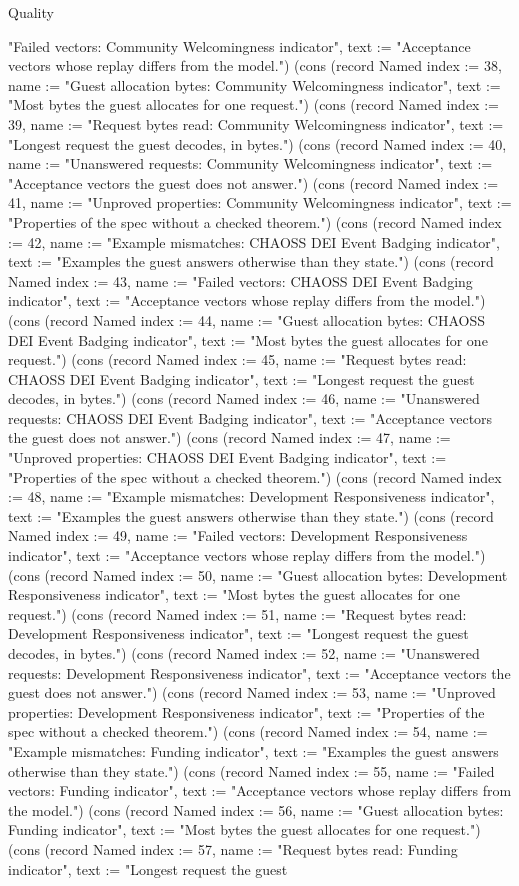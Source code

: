 \begin{lexlean}{Quality}
\begin{semanticmodule}
{"Failed vectors: Community Welcomingness indicator", text := "Acceptance vectors whose replay differs from the model."}) (cons (record Named {index := 38, name := "Guest allocation bytes: Community Welcomingness indicator", text := "Most bytes the guest allocates for one request."}) (cons (record Named {index := 39, name := "Request bytes read: Community Welcomingness indicator", text := "Longest request the guest decodes, in bytes."}) (cons (record Named {index := 40, name := "Unanswered requests: Community Welcomingness indicator", text := "Acceptance vectors the guest does not answer."}) (cons (record Named {index := 41, name := "Unproved properties: Community Welcomingness indicator", text := "Properties of the spec without a checked theorem."}) (cons (record Named {index := 42, name := "Example mismatches: CHAOSS DEI Event Badging indicator", text := "Examples the guest answers otherwise than they state."}) (cons (record Named {index := 43, name := "Failed vectors: CHAOSS DEI Event Badging indicator", text := "Acceptance vectors whose replay differs from the model."}) (cons (record Named {index := 44, name := "Guest allocation bytes: CHAOSS DEI Event Badging indicator", text := "Most bytes the guest allocates for one request."}) (cons (record Named {index := 45, name := "Request bytes read: CHAOSS DEI Event Badging indicator", text := "Longest request the guest decodes, in bytes."}) (cons (record Named {index := 46, name := "Unanswered requests: CHAOSS DEI Event Badging indicator", text := "Acceptance vectors the guest does not answer."}) (cons (record Named {index := 47, name := "Unproved properties: CHAOSS DEI Event Badging indicator", text := "Properties of the spec without a checked theorem."}) (cons (record Named {index := 48, name := "Example mismatches: Development Responsiveness indicator", text := "Examples the guest answers otherwise than they state."}) (cons (record Named {index := 49, name := "Failed vectors: Development Responsiveness indicator", text := "Acceptance vectors whose replay differs from the model."}) (cons (record Named {index := 50, name := "Guest allocation bytes: Development Responsiveness indicator", text := "Most bytes the guest allocates for one request."}) (cons (record Named {index := 51, name := "Request bytes read: Development Responsiveness indicator", text := "Longest request the guest decodes, in bytes."}) (cons (record Named {index := 52, name := "Unanswered requests: Development Responsiveness indicator", text := "Acceptance vectors the guest does not answer."}) (cons (record Named {index := 53, name := "Unproved properties: Development Responsiveness indicator", text := "Properties of the spec without a checked theorem."}) (cons (record Named {index := 54, name := "Example mismatches: Funding indicator", text := "Examples the guest answers otherwise than they state."}) (cons (record Named {index := 55, name := "Failed vectors: Funding indicator", text := "Acceptance vectors whose replay differs from the model."}) (cons (record Named {index := 56, name := "Guest allocation bytes: Funding indicator", text := "Most bytes the guest allocates for one request."}) (cons (record Named {index := 57, name := "Request bytes read: Funding indicator", text := "Longest request the guest }
\end{semanticmodule}
\end{lexlean}
